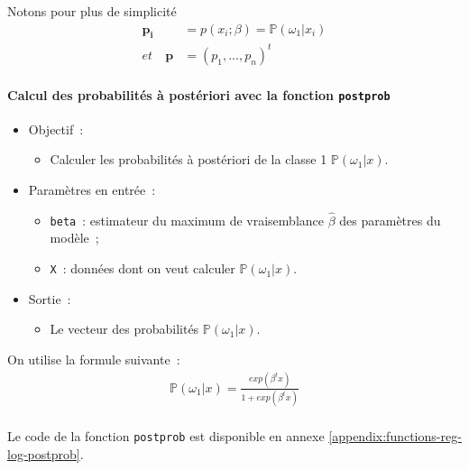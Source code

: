 \documentclass[a4paper,10pt]{report}
\begin{document}
Notons pour plus de simplicité
\begin{align*}
\textbf{p}_\textbf{i} &= p(x_i;\beta) = \mathbb{P}(\omega_1|x_i)\\
et \quad \textbf{p} &= (p_1, ..., p_n)^t
\end{align*}


\paragraph{Calcul des probabilités à postériori avec la fonction \texttt{postprob}}
\begin{itemize}
	\item Objectif~:
	\begin{itemize}
		\item Calculer les probabilités à postériori de la classe 1 $\mathbb{P}(\omega_1|x)$.
	\end{itemize}
	
	\item Paramètres en entrée~:
	\begin{itemize}
		\item \texttt{beta}~: estimateur du maximum de vraisemblance $\hat{\beta}$ des paramètres du modèle~;
		\item \texttt{X}~: données dont on veut calculer $\mathbb{P}(\omega_1|x)$.
	\end{itemize}
	
	\item Sortie~:
	\begin{itemize}
		\item Le vecteur des probabilités $\mathbb{P}(\omega_1|x)$.
	\end{itemize}
\end{itemize}

On utilise la formule suivante~:
\begin{align*}
\mathbb{P}(\omega_1|x) = \frac{exp(\beta^t x)}{1 + exp(\beta^t x)}\\
\end{align*}


Le code de la fonction \texttt{postprob} est disponible en annexe \ref{appendix:functions-reg-log-postprob}.
\end{document}
